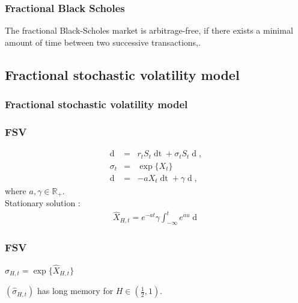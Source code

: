 \documentclass[]{beamer}
\begin{document}
\begin{frame}
  \frametitle{Fractional Black Scholes}
   The fractional Black-Scholes market is arbitrage-free, if there exists a minimal amount of time between two successive transactions,.
\end{frame}

\subsection{Fractional stochastic volatility model}
\frametitle{Fractional stochastic volatility model}
\begin{frame}
  \frametitle{FSV}
\begin{eqnarray*}
  \mathop{dS_t} &=& r_tS_t\mathop{dt} + \sigma_t S_t \mathop{dB_t},\\
  \sigma_t &=& \exp\{X_t\} \nonumber\\
  \mathop{dX_t} &=&  -a X_t \mathop{dt} + \gamma \mathop{dU_H(t)},
  \label{sec:fv}
\end{eqnarray*}
\hspace{7em}where $a, \gamma \in \mathbb{R}_{+}$. \\
Stationary solution :
\begin{eqnarray*}
\hat{X}_{H,t}= e^{-at}\gamma\int_{-\infty}^t e^{au}\mathop{dU_H(u)}
\label{sec:fv2}
\end{eqnarray*} 
\end{frame}

\begin{frame}
  \frametitle{FSV}
  $\hat{\sigma}_{H,t} = \exp\{\hat{X}_{H,t}\}$
  \begin{theorem}
  $(\hat{\sigma}_{H,t})$ has long memory for $H\in(\frac{1}{2}, 1)$. 
  \end{theorem}
\end{frame}
\end{document}
